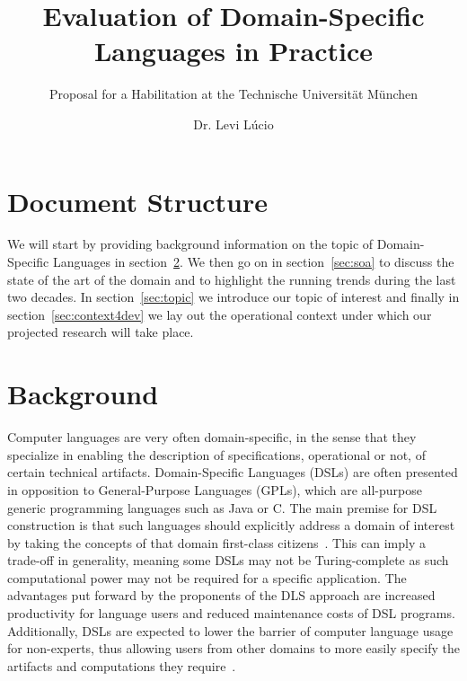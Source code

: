 \documentclass{scrartcl}
\begin{document}
\title{Evaluation of Domain-Specific Languages in Practice\\}
\subtitle{Proposal for a Habilitation at the Technische Universit\"at M\"unchen}

\author{Dr. Levi L\'ucio}

\maketitle


\section{Document Structure}

We will start by providing background information on the topic of
Domain-Specific Languages in section~\ref{sec:background}. We then go on  in
section~\ref{sec:soa} to discuss the state of the art of the domain and to
highlight the running trends during the last two decades. In
section~\ref{sec:topic} we introduce our topic of interest and finally in
section~\ref{sec:context4dev} we lay out the operational context under which our
projected research will take place.

\section{Background}
\label{sec:background}

Computer languages are very often domain-specific, in the sense that they
specialize in enabling the description of specifications, operational or not, of
certain technical artifacts. Domain-Specific Languages (DSLs) are often
presented in opposition to General-Purpose Languages (GPLs), which are
all-purpose generic programming languages such as Java or C. The main premise
for DSL construction is that such languages should explicitly address a domain of
interest by taking the concepts of that domain first-class
citizens~\cite{Kolovos06}. This can imply a trade-off in generality, meaning
some DSLs may not be Turing-complete as such computational power may not be
required for a specific application. The advantages put forward by the
proponents of the DLS approach are increased productivity for language users and reduced
maintenance costs of DSL programs. Additionally, DSLs are expected to lower the
barrier of computer language usage for non-experts, thus allowing users from
other domains to more easily specify the artifacts and computations they require~\cite{MernikHS05}.
\end{document}
